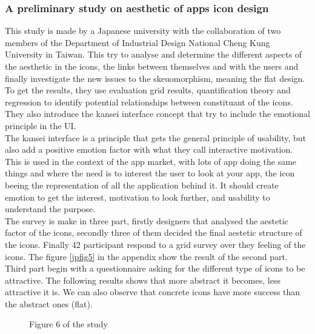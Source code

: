 \documentclass[a4paper,11pt] {article}
\theoremstyle{definition}
\begin{document}
    \subsubsection{A preliminary study on aesthetic of apps icon design\cite{jpAnalitics}}
This study is made by a Japanese university with the collaboration of two members of the Department of Industrial Design National Cheng Kung University in Taiwan. This try to analyse and determine the different aspects of the aesthetic in the icons, the links between themselves and with the users and finally investigate the new issues to the skeuomorphism, meaning the flat design. To get the results, they use evaluation grid results, quantification theory and regression to identify potential relationships between constituant of the icons. They also introduce the kansei interface concept that try to include the emotional principle in the UI.
\\
The kansei interface is a principle that gets the general principle of usability, but also add a positive emotion factor with what they call interactive motivation. This is used in the context of the app market, with lots of app doing the same things and where the need is to interest the user to look at your app, the icon beeing the representation of all the application behind it. It should create emotion to get the interest, motivation to look further, and usability to understand the purpose.
\\
The survey is make in three part, firstly designers that analysed the aestetic factor of the icons, secondly three of them decided the final aestetic structure of the icons. Finally 42 participant respond to a grid survey over they feeling of the icons. The figure \ref{jpfig5} in the appendix show the result of the second part.
\\
Third part begin with a questionnaire asking for the different type of icons to be attractive. The following results shows that more abstract it becomes, less attractive it is. We can also observe that concrete icons have more success than the abstract ones (flat).
\begin{figure}[H]
  \caption{Figure 6 of the study}\label{jpfig6}
\end{figure}
\end{document}
